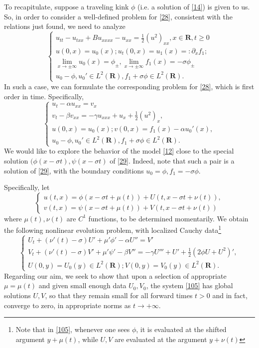 \documentclass[12pt]{amsart}
\theoremstyle{definition}
\theoremstyle{remark}
\numberwithin{equation}{section}
\renewcommand{\(}{\left(}
\renewcommand{\)}{\right)}
\renewcommand{\[}{\left[}
\renewcommand{\]}{\right]}
\newcommand{\f}[2]{\frac{#1}{#2}}
\newcommand{\al}{\alpha}
\newcommand{\be}{\beta}
\newcommand{\ga}{\gamma}
\newcommand{\si}{\sigma}
\newcommand{\rone}{\mathbf R}
\newcommand{\p}{\partial}
\begin{document}
To recapitulate, suppose a 
 traveling kink $\phi$ (i.e. a solution of \eqref{14}) is given to us. 
So, in order to consider a well-defined problem for \eqref{28}, consistent with the relations just found, we need to analyze 
\begin{equation}
	\label{102} 
	\begin{cases}
		u_{tt}-  u_{txx}+ B u_{xxxx} - u_{xx}=\f{1}{2}  (u^2)_{xx}, x\in \rone, t\geq 0 \\
		u(0,x)=u_0(x);  u_t(0,x)=u_1(x)=:\p_x f_1;\\
		\lim\limits_{x\to \pm \infty} u_0(x)=\phi_\pm, \lim\limits_{x\to \pm \infty} f_1(x)=-\si \phi_\pm\\
		u_0-\phi, u_0' \in L^2(\rone), f_1 + \si  \phi \in L^2(\rone). 
	\end{cases}
\end{equation}
In such a case, we can formulate the corresponding problem for \eqref{28}, which is first order in time. Specifically,  
\begin{equation}
	\label{29} 
	\begin{cases}
		u_t - \al u_{xx}= v_x \\
		v_t-\be  v_{xx}  = -\ga  u_{xxx}  + u_x +\f{1}{2} (u^2)_x, \\
		u(0,x)=u_0(x); v(0,x)= f_1(x)-\al u_0'(x), \\
		u_0-\phi, u_0'\in L^2(\rone), f_1 + \si  \phi \in L^2(\rone).
	\end{cases}
\end{equation} 
We would like to explore the behavior of the model \eqref{12} close to the special solution $(\phi(x - \si t), \psi(x- \si t)$ of \eqref{29}.  Indeed, note that such a pair is a solution of \eqref{29}, with the boundary conditions $u_0=\phi, f_1=-\si  \phi$. 

Specifically, let
$$
\begin{cases}
	u(t,x)= \phi(x-\si t+\mu(t))+U(t, x-\si t +\nu(t)), \\
	v(t,x)= \psi(x-\si t+\mu(t)) +V(t, x-\si t + \nu(t))
\end{cases}
$$
where $\mu(t), \nu(t)$ are  $C^1$ functions, to be determined momentarily. We obtain the following nonlinear evolution problem, with localized Cauchy data\footnote{Note that in \eqref{105},  whenever one sees $\phi$, it is evaluated at the shifted argument $y+\mu(t)$, while $U,V$ are evaluated at the argument $y+\nu(t)$}
\begin{equation}
	\label{105} 
	\begin{cases}
		U_t +(\nu'(t)-\si)  U'+\mu' \phi' - \al U''= V' \\
		V_t+(\nu'(t)-\si) V' +\mu'\psi'-\be  V''  = -\ga  U''' + U' + \f{1}{2} (2\phi U+U^2)', \\
		U(0,y)=U_0(y) \in L^2(\rone) ; V(0,y)= V_0(y) \in L^2(\rone). 
	\end{cases}
	\end{equation} 
 Regarding our aim, we seek to show that upon a selection of appropriate $\mu=\mu(t)$ and  given small enough data $U_0, V_0$, the system \eqref{105} has global solutions $U, V$, so that they remain small for all forward times $t>0$ and in fact, converge to zero, in appropriate norms as $t\to +\infty$. 
\end{document}
